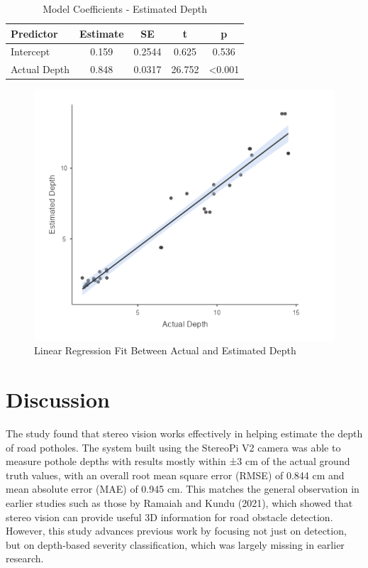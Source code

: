 \begin{table}[H]
	\centering
	\begin{tabular}{|l|c|c|c|c|}
		\hline
		\textbf{Predictor} & \textbf{Estimate} & \textbf{SE} & \textbf{t} & \textbf{p} \\
		\hline
		Intercept & 0.159 & 0.2544 & 0.625 & 0.536 \\
		Actual Depth & 0.848 & 0.0317 & 26.752 & \textless 0.001 \\
		\hline
	\end{tabular}
	\caption{Model Coefficients - Estimated Depth}
	\label{tab:model_coefficients}
\end{table}

\begin{figure}[H]
	\centering
	\includegraphics[scale=0.55]{regression.png}
	\caption{Linear Regression Fit Between Actual and Estimated Depth}
	\label{fig:model}
\end{figure}


\section{Discussion}
The study found that stereo vision works effectively in helping estimate the depth of road potholes. The system built using the StereoPi V2 camera was able to measure pothole depths with results mostly within ±3 cm of the actual ground truth values, with an overall root mean square error (RMSE) of 0.844 cm and mean absolute error (MAE) of 0.945 cm. This matches the general observation in earlier studies such as those by Ramaiah and Kundu (2021), which showed that stereo vision can provide useful 3D information for road obstacle detection. However, this study advances previous work by focusing not just on detection, but on depth-based severity classification, which was largely missing in earlier research.

